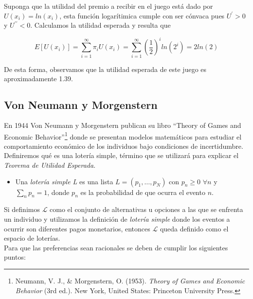 Suponga que la utilidad del premio a recibir en el juego está dado por $U(x_i) = ln(x_i)$, esta función logarítimica cumple con ser cónvaca pues $U^\prime > 0$ y $U^{\prime \prime} < 0$. Calculamos la utilidad esperada y resulta que

$$
E[U(x_i)] = \sum_{i = 1} ^{\infty} \pi_i U(x_i) = \sum_{i = 1} ^{\infty} (\frac{1}{2})^i ln(2^i)= 2 ln(2)
$$

De esta forma, observamos que la utilidad esperada de este juego es aproximadamente 1.39.

\newpage

\subsection{Von Neumann y Morgenstern}

En 1944 Von Neumann y Morgenstern publican su libro “Theory of Games and Economic Behavior”\footnote{Neumann, V. J., \& Morgenstern, O. (1953). \textit{Theory of Games and Economic Behavior} (3rd ed.). New York, United States: Princeton University Press.} donde se presentan modelos matemáticos para estudiar el comportamiento económico de los individuos bajo condiciones de incertidumbre.   \\

Definiremos qué es una lotería simple, término que se utilizará para explicar el \textit{Teorema de Utilidad Esperada}.

\begin{itemize}
    \item Una \textit{lotería simple L} es una lista $L = (p_1, \dots, p_N)$ con $p_n \geq 0$ $\forall n$ y $\sum_n p_n = 1$, donde $p_n$ es la probabilidad de que ocurra el evento $n$.
\end{itemize}

Si definimos $\mathscr{L}$ como el conjunto de alternativas u opciones a las que se enfrenta un individuo y utilizamos la definición de \textit{lotería simple} donde los eventos a ocurrir son diferentes pagos monetarios, entonces $\mathscr{L}$ queda definido como el espacio de loterías. \\

Para que las preferencias sean racionales se deben de cumplir los siguientes puntos:

